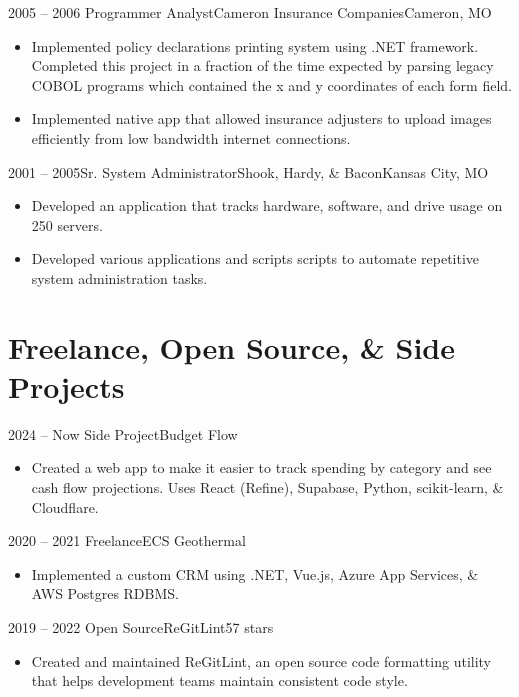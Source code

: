 \documentclass[11pt,letterpaper,final]{moderncv}
\begin{document}
	\cventry
{2005 -- 2006} {Programmer Analyst}{Cameron Insurance Companies}{Cameron, MO}{}{
		\begin{itemize}
			\item
				Implemented policy declarations printing system using .NET framework.
				Completed this project in a fraction of the time expected by
				parsing legacy COBOL programs which contained the x and y
				coordinates of each form field.
			\item
				Implemented native app that allowed insurance adjusters
				to upload images efficiently from low bandwidth internet
				connections.
		\end{itemize}
}
\linebreak

	\cventry
{2001 -- 2005}{Sr. System Administrator}{Shook, Hardy, \& Bacon}{Kansas City, MO}{}{
		\begin{itemize}
			\item
				Developed an application that tracks hardware, software, and
				drive usage on 250 servers.
			\item
				Developed various applications and scripts scripts to
				automate repetitive system administration tasks.
		\end{itemize}
}
\linebreak

\section{Freelance, Open Source, \& Side Projects} 
	\cventry
{2024 -- Now} {Side Project}{Budget Flow}{}{}{
		\begin{itemize}
			\item 
				Created a web app to make it easier to track spending by
				category and see cash flow projections. Uses React (Refine),
				Supabase, Python, scikit-learn, \& Cloudflare.
		\end{itemize}
}
\linebreak

	\cventry
{2020 -- 2021} {Freelance}{ECS Geothermal}{}{}{
		\begin{itemize}
			\item 
				Implemented a custom CRM using .NET, Vue.js, Azure App Services,
				\& AWS Postgres RDBMS.
		\end{itemize}
}
\linebreak

	\cventry
{2019 -- 2022} {Open Source}{ReGitLint}{}{57 stars}{
		\begin{itemize}
			\item 
				Created and maintained ReGitLint, an open source code formatting
				utility that helps development teams maintain consistent code
				style.
		\end{itemize}
}
\linebreak
\end{document}
